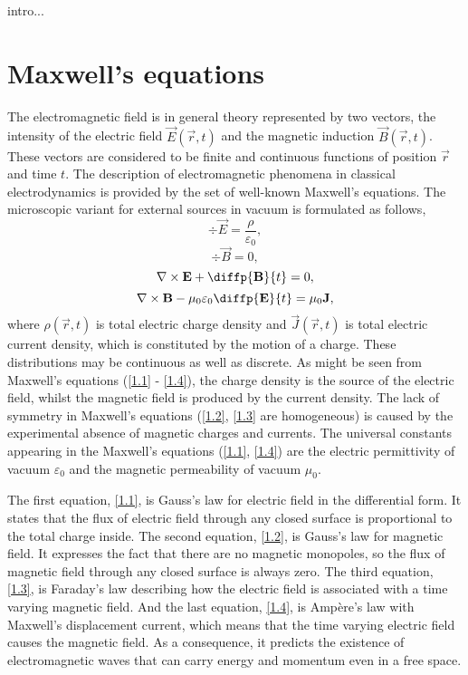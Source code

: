 intro...
\section{Maxwell's equations}
The electromagnetic field is in general theory represented by two vectors, the intensity of the electric field $ \vec{E}\left( \vec{r}, t \right) $ and the magnetic induction $ \vec{B}\left( \vec{r}, t \right) $. These vectors are considered to be finite and continuous functions of position $ \vec{r} $ and time $ t $. The description of electromagnetic phenomena in classical electrodynamics is provided by the set of well-known Maxwell's equations. The microscopic variant for external sources in vacuum is formulated as follows,
\begin{equation}
\label{1.1}
\div{\vec{E}} = \frac{\rho}{\varepsilon_0},
\end{equation}
\begin{equation}
\label{1.2}
\div{\vec{B}} = 0,
\end{equation}
\begin{equation}
\label{1.3}
\rot{\vec{E}} + \diffp{\vec{B}}{t} = 0,
\end{equation}
\begin{equation}
\label{1.4}
\rot{\vec{B}} - \mu_0 \varepsilon_0 \diffp{\vec{E}}{t}= \mu_0 \vec{J},
\end{equation}
where $ \rho\left( \vec{r}, t \right) $ is total electric charge density and $ \vec{J}\left( \vec{r}, t \right) $ is total electric current density, which is constituted by the motion of a charge. These distributions may be continuous as well as discrete. As might be seen from Maxwell's equations (\ref{1.1} - \ref{1.4}), the charge density is the source of the electric field, whilst the magnetic field is produced by the current density. The lack of symmetry in Maxwell's equations (\ref{1.2}, \ref{1.3} are homogeneous) is caused by the experimental absence of magnetic charges and currents. The universal constants appearing in the Maxwell's equations (\ref{1.1}, \ref{1.4}) are the electric permittivity of vacuum $ \varepsilon_0 $ and the magnetic permeability of vacuum $ \mu_0 $.

The first equation, \ref{1.1}, is Gauss's law for electric field in the differential form. It states that the flux of electric field through any closed surface is proportional to the total charge inside. The second equation, \ref{1.2}, is Gauss's law for magnetic field. It expresses the fact that there are no magnetic monopoles, so the flux of magnetic field through any closed surface is always zero. The third equation, \ref{1.3}, is Faraday's law describing how the electric field is associated with a time varying magnetic field. And the last equation, \ref{1.4}, is Amp\`ere's law with Maxwell's displacement current, which means that the time varying electric field causes the magnetic field. As a consequence, it predicts the existence of electromagnetic waves that can carry energy and momentum even in a free space.

